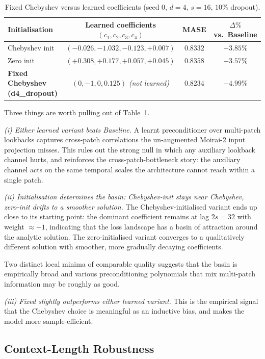 \documentclass[11pt]{article}
\theoremstyle{plain}
\theoremstyle{definition}
\theoremstyle{remark}
\newcommand{\HD}{\textsf{d4\_dropout}}
\newcommand{\Baseline}{\textsf{Baseline}}
\begin{document}
\begin{table}[h]
\centering
\small
\caption{Fixed Chebyshev versus learned coefficients (seed 0, $d=4$, $s=16$, $10\%$ dropout). }
\label{tab:learned-fir}
\begin{tabular}{lccc}
\toprule
\textbf{Initialisation} & \textbf{Learned coefficients $(c_1, c_2, c_3, c_4)$} & \textbf{MASE} & \textbf{$\Delta\%$ vs.\ \Baseline{}} \\
\midrule
Chebyshev init   & $(-0.026, -1.032, -0.123, +0.007)$ & $0.8332$ & $-3.85\%$ \\
Zero init        & $(+0.308, +0.177, +0.057, +0.045)$ & $0.8358$ & $-3.57\%$ \\
\textbf{Fixed Chebyshev (\HD{})} & $(0, -1, 0, 0.125)$ \emph{(not learned)} & $\mathbf{0.8234}$ & $\mathbf{-4.99\%}$ \\
\bottomrule
\end{tabular}
\end{table}

Three things are worth pulling out of Table~\ref{tab:learned-fir}.

\emph{(i) Either learned variant beats \Baseline{}.} A learnt preconditioner over multi-patch lookbacks captures cross-patch correlations the un-augmented Moirai-2 input projection misses. This rules out the strong null in which any auxiliary lookback channel hurts, and reinforces the cross-patch-bottleneck story: the auxiliary channel acts on the same temporal scales the architecture cannot reach within a single patch.

\emph{(ii) Initialisation determines the basin: Chebyshev-init stays near Chebyshev, zero-init drifts to a smoother solution.} The Chebyshev-initialised variant ends up close to its starting point: the dominant coefficient remains at lag $2s = 32$ with weight $\approx -1$, indicating that the loss landscape has a basin of attraction around the analytic solution. The zero-initialised variant converges to a qualitatively different solution with smoother, more gradually decaying coefficients.

Two distinct local minima of comparable quality suggests that the basin is empirically broad and various preconditioning polynomials that mix multi-patch information may be roughly as good.

\emph{(iii) Fixed slightly outperforms either learned variant.} This is the empirical signal that the Chebyshev choice is meaningful as an inductive bias, and makes the model more sample-efficient. 

\subsection{Context-Length Robustness}
\label{sec:contextlen}
\end{document}
